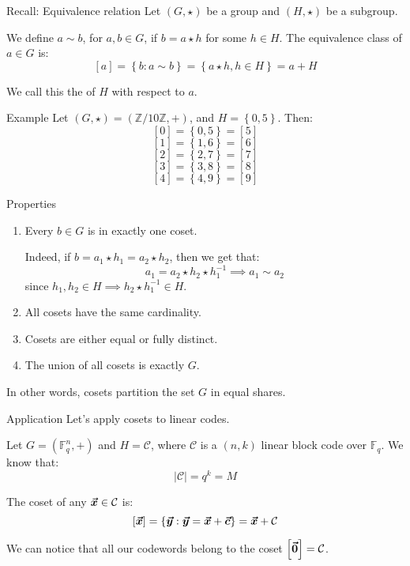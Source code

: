 \documentclass[a4paper]{article}
\begin{document}
\begin{parag}{Recall: Equivalence relation}
    Let $\left(G, \star\right)$ be a group and $\left(H, \star\right)$ be a subgroup. 

    We define $a \sim b$, for $a, b \in G$, if $b = a \star h$ for some $h \in H$. The equivalence class of $a \in G$ is: 
    \[\left[a\right] = \left\{b : a \sim b\right\} = \left\{a \star h, h \in H\right\} = a + H\]
    
    We call this the  of $H$ with respect to $a$.

    \begin{subparag}{Example}
        Let $\left(G, \star\right) = \left(\mathbb{Z}/10\mathbb{Z}, +\right)$, and $H = \left\{0, 5\right\}$. Then: 
        \[\left[0\right] = \left\{0, 5\right\} = \left[5\right]\] 
        \[\left[1\right] = \left\{1, 6\right\} = \left[6\right]\]
        \[\left[2\right] = \left\{2, 7\right\} = \left[7\right]\] 
        \[\left[3\right] = \left\{3, 8\right\} = \left[8\right]\]
        \[\left[4\right] = \left\{4, 9\right\} = \left[9\right]\]
    \end{subparag}

    \begin{subparag}{Properties}
        \begin{enumerate}[left=0pt]
            \item Every $b \in G$ is in exactly one coset.
        
        Indeed, if $b = a_1 \star h_1 = a_2 \star h_2$, then we get that: 
        \[a_1 = a_2 \star h_2 \star h_1^{-1} \implies a_1 \sim a_2\]
        since $h_1, h_2 \in H \implies h_2 \star h_1^{-1} \in H$.
        \item All cosets have the same cardinality.
        \item Cosets are either equal or fully distinct. 
        \item The union of all cosets is exactly $G$.
        \end{enumerate}

        In other words, cosets partition the set $G$ in equal shares.
    \end{subparag}
\end{parag}

\begin{parag}{Application}
    Let's apply cosets to linear codes.

    Let $G = \left(\mathbb{F}_q^n, +\right)$ and $H = \mathcal{C}$, where $\mathcal{C}$ is a $\left(n, k\right)$ linear block code over $\mathbb{F}_q$. We know that: 
    \[\left|\mathcal{C}\right| = q^k = M\]
    
    The coset of any $\bm{\protect\vec{x}} \in \mathcal{C}$ is: 
    \[\left[\bvec{x}\right] = \left\{\bvec{y} : \bvec{y}= \bvec{x} + \bvec{c}\right\} = \bvec{x} + \mathcal{C}\]
    
    We can notice that all our codewords belong to the coset $\left[\bvec{0}\right] = \mathcal{C}$.
\end{parag}
\end{document}
